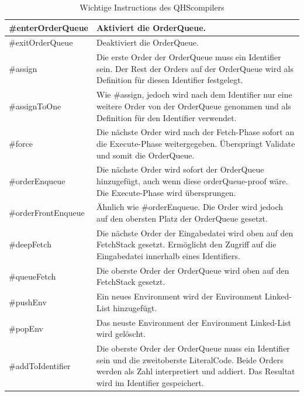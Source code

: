 \begin{table}[H]
    \centering
    \caption{Wichtige Instructions des QHScompilers}
    \label{tab:important_instructions}
    \vspace{3mm} %
    
    \begin{tabularx}{\textwidth}{l|X}
    \#enterOrderQueue      & Aktiviert die OrderQueue. \\ \hline
    \#exitOrderQueue       & Deaktiviert die OrderQueue. \\ \hline
    \#assign               & Die erste Order der OrderQueue muss ein Identifier sein. Der Rest der Orders auf der OrderQueue wird als Definition für diesen Identifier festgelegt. \\ \hline
    \#assignToOne          & Wie \#assign, jedoch wird nach dem Identifier nur eine weitere Order von der OrderQueue genommen und als Definition für den Identifier verwendet. \\ \hline
    \#force                & Die nächste Order wird nach der Fetch-Phase sofort an die Execute-Phase weitergegeben. Überspringt Validate und somit die OrderQueue. \\ \hline
    \#orderEnqueue         & Die nächste Order wird sofort der OrderQueue hinzugefügt, auch wenn diese orderQueue-proof wäre. Die Execute-Phase wird übersprungen. \\ \hline
    \#orderFrontEnqueue    & Ähnlich wie \#orderEnqueue. Die Order wird jedoch auf den obersten Platz der OrderQueue gesetzt. \\ \hline
    \#deepFetch            & Die nächste Order der Eingabedatei wird oben auf den FetchStack gesetzt. Ermöglicht den Zugriff auf die Eingabedatei innerhalb eines Identifiers. \\ \hline
    \#queueFetch           & Die oberste Order der OrderQueue wird oben auf den FetchStack gesetzt. \\ \hline 
    \#pushEnv              & Ein neues Environment wird der Environment Linked-List hinzugefügt. \\ \hline
    \#popEnv               & Das neuste Environment der Environment Linked-List wird gelöscht. \\ \hline
    \#addToIdentifier      & Die oberste Order der OrderQueue muss ein Identifier sein und die zweitoberste LiteralCode. Beide Orders werden als Zahl interpretiert und addiert.
                                      Das Resultat wird im Identifier gespeichert.       
    \end{tabularx}
\end{table}

